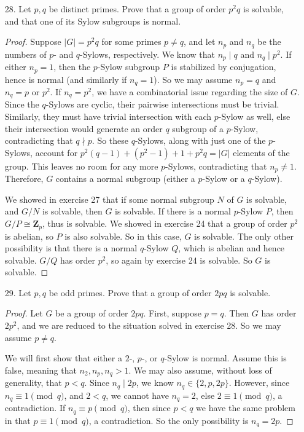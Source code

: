 \documentclass[10pt]{article}
\newcommand{\Z}{\mathbf{Z}}
\begin{document}
\begin{enumerate}
\item[28.] Let $p, q$ be distinct primes.  Prove that a group of order $p^2 q$ is solvable, and that one of its Sylow subgroups is normal.

\begin{proof}
Suppose $|G| = p^2q$ for some primes $p \neq q$, and let $n_p$ and $n_q$ be the numbers of $p$- and $q$-Sylows, respectively.  We know that $n_p \mid q$ and $n_q \mid p^2$.  If either $n_p = 1$, then the $p$-Sylow subgroup $P$ is stabilized by conjugation, hence is normal (and similarly if $n_q = 1$).  So we may assume $n_p = q$ and $n_q = p$ or $p^2$.  If $n_q = p^2$, we have a combinatorial issue regarding the size of $G$.  Since the $q$-Sylows are cyclic, their pairwise intersections must be trivial.  Similarly, they must have trivial intersection with each $p$-Sylow as well, else their intersection would generate an order $q$ subgroup of a $p$-Sylow, contradicting that $q \nmid p$.  So these $q$-Sylows, along with just one of the $p$-Sylows, account for $p^2(q-1) + (p^2 - 1) + 1 + p^2q = |G|$ elements of the group.  This leaves no room for any more $p$-Sylows, contradicting that $n_p \neq 1$.  Therefore, $G$ contains a normal subgroup (either a $p$-Sylow or a $q$-Sylow).

We showed in exercise 27 that if some normal subgroup $N$ of $G$ is solvable, and $G / N$ is solvable, then $G$ is solvable.  If there is a normal $p$-Sylow $P$, then $G / P \cong \Z_p$, thus is solvable.  We showed in exercise 24 that a group of order $p^2$ is abelian, so $P$ is also solvable.  So in this case, $G$ is solvable.  The only other possibility is that there is a normal $q$-Sylow $Q$, which is abelian and hence solvable.  $G/Q$ has order $p^2$, so again by exercise 24 is solvable.  So $G$ is solvable.
\end{proof}

\item[29.] Let $p,q$ be odd primes.  Prove that a group of order $2pq$ is solvable.

\begin{proof}
Let $G$ be a group of order $2pq$.  First, suppose $p = q$.  Then $G$ has order $2p^2$, and we are reduced to the situation solved in exercise 28.  So we may assume $p \neq q$.

We will first show that either a $2$-, $p$-, or $q$-Sylow is normal.  Assume this is false, meaning that $n_2, n_p, n_q > 1$.  We may also assume, without loss of generality, that $p < q$.  Since $n_q \mid 2p$, we know $n_q \in \{2,p,2p\}$.  However, since $n_q \equiv 1 \pmod{q}$, and $2 < q$, we cannot have $n_q = 2$, else $2 \equiv 1 \pmod {q}$, a contradiction.  If $n_q \equiv p \pmod{q}$, then since $p < q$ we have the same problem in that $p \equiv 1 \pmod{q}$, a contradiction.  So the only possibility is $n_q = 2p$.


\end{proof}
\end{enumerate}
\end{document}
